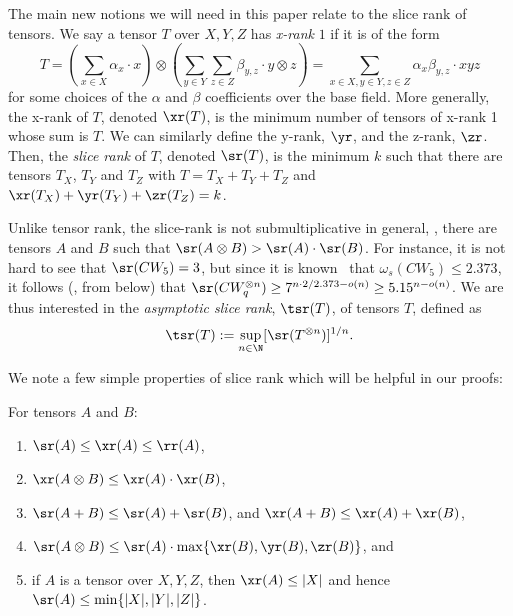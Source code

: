\documentclass{toc}
\begin{document}
The main new notions we will need in this paper relate to the slice rank of tensors. We say a tensor $T$ over $X,Y,Z$ has \emph{x-rank} $1$ if it is of the form
$$T = \left( \sum_{x \in X} \alpha_x \cdot x \right) \otimes \left( \sum_{y \in Y} \sum_{z \in Z} \beta_{y,z} \cdot y \otimes z \right) = \sum_{x \in X, y \in Y, z \in Z} \alpha_x \beta_{y,z} \cdot xyz$$
for some choices of the $\alpha$ and $\beta$ coefficients over the base field. More generally, the x-rank of $T$, denoted $\xr(T)$, is the minimum number of tensors of x-rank 1 whose sum is $T$. We can similarly define the y-rank, $\yr$, and the z-rank, $\zr$. Then, the \emph{slice rank} of $T$, denoted $\sr(T)$, is the minimum $k$ such that there are tensors $T_X$, $T_Y$ and $T_Z$ with $T = T_X + T_Y + T_Z$ and $\xr(T_X) + \yr(T_Y) + \zr(T_Z) = k$.

Unlike tensor rank, the slice-rank is not submultiplicative in general, \ie, there are tensors $A$ and $B$ such that $\sr(A \otimes B) > \sr(A) \cdot \sr(B)$. For instance, it is not hard to see that $\sr(CW_5) = 3$, but since 
%
it is known~\cite{v12,legall,awrefined} that $\omega_s(CW_5) \leq 2.373$, 
it follows (\eg, from  below) that $\sr(CW_q^{\otimes n}) \geq 7^{n \cdot 2/2.373 - o(n)} \geq 5.15^{n - o(n)}$. We are thus interested in the \emph{asymptotic slice rank}, $\tsr(T)$, of tensors $T$, defined as
$$\tsr(T) := \sup_{n \in \N} [\sr(T^{\otimes n})]^{1/n}.$$

We note a few simple properties of slice rank which will be helpful in our proofs:

\begin{lemma} \label{propertieslemma}
For tensors $A$ and $B$:

\begin{enumerate}[(1)]
    \item $\sr(A) \leq \xr(A) \leq \rr(A)$,
    \item $\xr(A \otimes B) \leq \xr(A) \cdot \xr(B)$,
    \item $\sr(A + B) \leq \sr(A) + \sr(B)$, and $\xr(A+B) \leq \xr(A) + \xr(B)$,
    \item $\sr(A \otimes B) \leq \sr(A) \cdot \max \{ \xr(B), \yr(B), \zr(B) \}$, and
    \item if $A$ is a tensor over $X,Y,Z$, then $\xr(A) \leq |X|$ and hence $\sr(A) \leq \min\{ |X|, |Y|, |Z|\}$. \label{propertieslemmapt5}
\end{enumerate}
\end{lemma}
\end{document}

